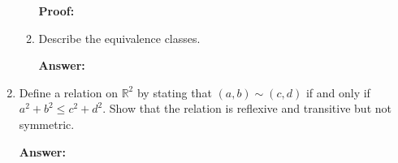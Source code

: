 \documentclass[12pt]{article}
\newcommand{\bbR}{\mathbb{R}}
\begin{document}
\begin{enumerate}
\begin{enumerate}
	\vspace{0.3in}
	
	\textbf{Proof:} 
	
	\vspace{3in}
	
	\item Describe the equivalence classes.
	
	\vspace{0.3in}
	
	\textbf{Answer:} 
	
	\vspace{3in}
	\end{enumerate}
\item Define a relation on $\bbR^2$ by stating that $(a,b) \sim (c,d)$ if and only if $a^2+b^2 \leq c^2+d^2.$ Show that the relation is reflexive and transitive but not symmetric.

\vspace{0.3in}
	
	\textbf{Answer:} 
	
	\vspace{3in}

\end{enumerate}
\end{document}
